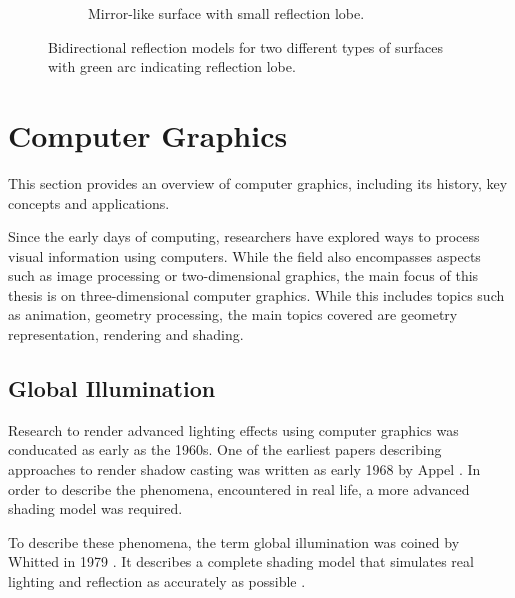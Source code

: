 \begin{figure}[H]
\begin{subfigure}[t]{0.45\textwidth}
    \caption{Mirror-like surface with small reflection lobe.}
    \label{fig:reflection-lobe-intro-specular}
  \end{subfigure}
  \caption{Bidirectional reflection models for two different types of surfaces with green arc indicating reflection lobe.}
  \label{fig:reflection-lobe-intro}
\end{figure}

\section{Computer Graphics}
\label{ch:computerGraphics}

This section provides an overview of computer graphics, including its history, key concepts and applications.

Since the early days of computing, researchers have explored ways to process visual information using computers. While the field also encompasses aspects such as image processing or two-dimensional graphics, the main focus of this thesis is on three-dimensional computer graphics. While this includes topics such as animation, geometry processing, the main topics covered are geometry representation, rendering and shading.

\subsection{Global Illumination}

Research to render advanced lighting effects using computer graphics was conducated as early as the 1960s. One of the earliest papers describing approaches to render shadow casting was written as early 1968 by Appel \cite{appel1968shading}. In order to describe the phenomena, encountered in real life, a more advanced shading model was required.

To describe these phenomena, the term global illumination was coined by Whitted in 1979 \cite{whittedGlobalIllumination}. It describes a complete shading model that simulates real lighting and reflection as accurately as possible \cite{whitted2020OriginsOfGlobalIllumination}. 

